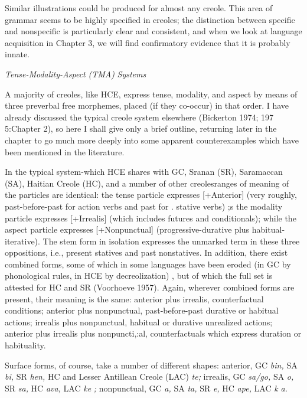 Similar illustrations could be produced for almost any creole. This area of grammar seems to be highly specified in creoles; the dis\-tinction between specific and nonspecific is particularly clear and consistent, and when we look at language acquisition in Chapter 3, we will find confirmatory evidence that it is probably innate.

\textit{Tense-Modality-Aspect} \textit{(TM}\textit{A}\textit{)} \textit{S}\textit{ystems}

A majority of creoles, like HCE, express tense, modality, and aspect by means of three preverbal free morphemes, placed (if they co-occur) in that order. I have already discussed the typical creole system elsewhere (Bickerton 1974; 197 5:Chapter 2), so here I shall give only a brief outline, returning later in the chapter to go much more deeply into some apparent counterexamples which have been men\-tioned in the literature.

In the typical system-which HCE shares with GC, Sranan (SR), Saramaccan (SA), Haitian Creole (HC), and a number of other creoles\-ranges of meaning of the particles are identical: the tense particle ex\-presses [+Anterior] (very roughly, past-before-past for action verbs and past for . stative verbs) ;s the modality particle expresses [+Irrealis] (which includes futures and conditionals); while the aspect particle expresses [+Nonpunctual] (progressive-durative plus habitual-iterative). The stem form in isolation expresses the unmarked term in these three oppositions, i.e., present statives and past nonstatives. In addition, there exist combined forms, some of which in some languages have been eroded (in GC by phonological rules, in HCE by decreolization) , but of which the full set is attested for HC \citep{Hall1953} and SR (Voor\-hoeve 1957). Again, wherever combined forms are present, their meaning is the same: anterior plus irrealis, counterfactual conditions; anterior plus nonpunctual, past-before-past durative or habitual actions; irrealis plus nonpunctual, habitual or durative unrealized actions; anterior plus irrealis plus nonpuncti,:al, counterfactuals which express duration or habituality.


Surface forms, of course, take a number of different shapes: anterior, GC \textit{bin,} SA \textit{bi,} SR \textit{hen,} HC and Lesser Antillean Creole (LAC) \textit{te;} irrealis, GC \textit{sa/go,} SA \textit{o,} SR \textit{sa,} HC \textit{ava,} LAC \textit{ke} \textit{;} nonpunc\-tual, GC \textit{a,} SA \textit{ta,} SR \textit{e,} HC \textit{ape,} LAC \textit{k} \textit{a.}

